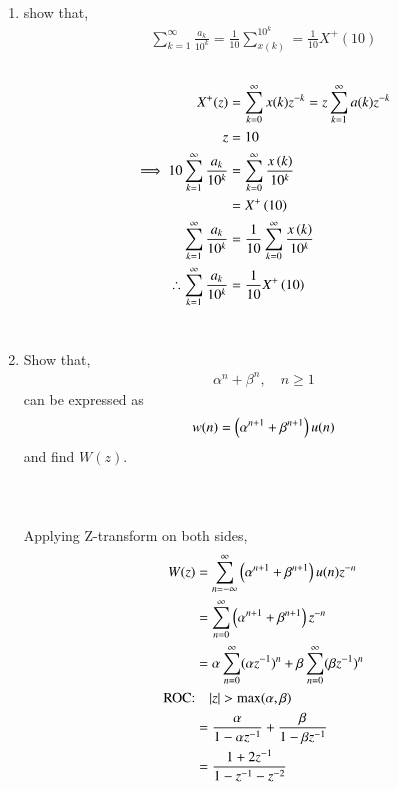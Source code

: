 \documentclass[journal,12pt,twocolumn]{IEEEtran}
\renewcommand\thesection{\arabic{section}}
\begin{document}
\begin{enumerate}[label=\thesection.\arabic*,ref=\thesection.\theenumi]
	\item 
		show that,
		\begin{align}
			\sum_{k=1}^{\infty}\frac{a_k}{10^k} = \frac{1}{10}\sum_{x(k)}^{10^k} = \frac{1}{10}X^+(10)
		\end{align}
	\solution\\
		\begin{align}
			X^{+}(z) & =\sum_{k=0}^{\infty} x(k)z^{-k}=z\sum_{k=1}^{\infty} a(k) z^{-k}\\
			z & =10\\
			\implies 10\sum_{k=1}^{\infty}\frac{a_k}{10^k} & =\sum_{k=0}^{\infty}\frac{x\left(k\right)}{10^k}\\ & =X^{+}\left({10}\right)\\
			\sum_{k=1}^{\infty}\frac{a_k}{10^k} & = \frac{1}{10}\sum_{k=0}^{\infty}\frac{x\left(k\right)}{10^k}\\
			\therefore \sum_{k=1}^{\infty}\frac{a_k}{10^k} & = \frac{1}{10}X^{+}\left({10}\right)
		\end{align}\\
	
	\item 
		Show that,
		\begin{align}
			\alpha^n + \beta^n, \quad n \ge 1
		\end{align}
		can be expressed as
		\begin{align}
			w(n) =\left(\alpha^{n+1} + \beta^{n+1}\right)u(n)
		\end{align}
		and find $W(z)$.\\ \ \\
	\solution\\ \ \\
		Applying Z-transform on both sides,
		\begin{align}
			W(z)&=\sum_{n=-\infty}^{\infty}\brak{\alpha^{n+1} + \beta^{n+1}}u(n)z^{-n}\\
			& = \sum_{n=0}^{\infty}\brak{\alpha^{n+1} + \beta^{n+1}}z^{-n}\\
			& = \alpha \sum_{n=0}^{\infty}(\alpha z^{-1})^{n}+\beta \sum_{n=0}^{\infty} (\beta z^{-1})^{n}\\
			\text{ROC:} & \quad |z|>\text{max}(\alpha,\beta) \nonumber \\
			& = \frac{\alpha}{1-\alpha z^{-1}}+\frac{\beta}{1-\beta z^{-1}}\\
			& = \frac{1+2z^{-1}}{1-z^{-1}-z^{-2}}
		\end{align}


\end{enumerate}
\end{document}
